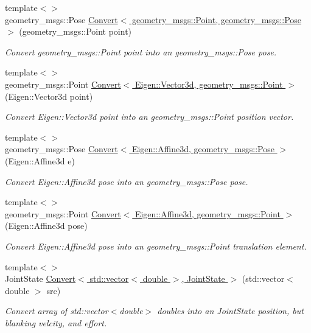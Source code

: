 \begin{DoxyCompactItemize}
{\footnotesize template$<$$>$ }\\geometry\-\_\-msgs\-::\-Pose \hyperlink{namespaceConversion_a7c35f538dfd4cbfa4ae5f428af02ba2c}{Convert$<$ geometry\-\_\-msgs\-::\-Point, geometry\-\_\-msgs\-::\-Pose $>$} (geometry\-\_\-msgs\-::\-Point point)
\begin{DoxyCompactList}\small\item\em Convert geometry\-\_\-msgs\-::\-Point point into an geometry\-\_\-msgs\-::\-Pose pose. \end{DoxyCompactList}\item 
{\footnotesize template$<$$>$ }\\geometry\-\_\-msgs\-::\-Point \hyperlink{namespaceConversion_a6826a33bcb1238949dac9a7aadea3385}{Convert$<$ Eigen\-::\-Vector3d, geometry\-\_\-msgs\-::\-Point $>$} (Eigen\-::\-Vector3d point)
\begin{DoxyCompactList}\small\item\em Convert Eigen\-::\-Vector3d point into an geometry\-\_\-msgs\-::\-Point position vector. \end{DoxyCompactList}\item 
{\footnotesize template$<$$>$ }\\geometry\-\_\-msgs\-::\-Pose \hyperlink{namespaceConversion_a7b91904dac5c5890ddb978512a21daa5}{Convert$<$ Eigen\-::\-Affine3d, geometry\-\_\-msgs\-::\-Pose $>$} (Eigen\-::\-Affine3d e)
\begin{DoxyCompactList}\small\item\em Convert Eigen\-::\-Affine3d pose into an geometry\-\_\-msgs\-::\-Pose pose. \end{DoxyCompactList}\item 
{\footnotesize template$<$$>$ }\\geometry\-\_\-msgs\-::\-Point \hyperlink{namespaceConversion_aafd6a17437fc2dfa296f4be4da5d2efd}{Convert$<$ Eigen\-::\-Affine3d, geometry\-\_\-msgs\-::\-Point $>$} (Eigen\-::\-Affine3d pose)
\begin{DoxyCompactList}\small\item\em Convert Eigen\-::\-Affine3d pose into an geometry\-\_\-msgs\-::\-Point translation element. \end{DoxyCompactList}\item 
{\footnotesize template$<$$>$ }\\Joint\-State \hyperlink{namespaceConversion_aab13ef132c54134d0b2b30c21aebd435}{Convert$<$ std\-::vector$<$ double $>$, Joint\-State $>$} (std\-::vector$<$ double $>$ src)
\begin{DoxyCompactList}\small\item\em Convert array of std\-::vector$<$double$>$ doubles into an Joint\-State position, but blanking velcity, and effort. \end{DoxyCompactList}\end{DoxyCompactItemize}


